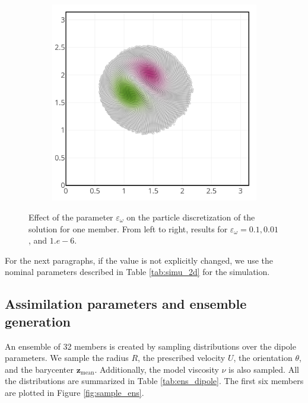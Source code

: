 \begin{figure}[htbp]
\begin{subfigure}{0.3\textwidth}
	\end{subfigure}
	\hfill
	\begin{subfigure}{0.3\textwidth}
		\includegraphics[width=\linewidth]{images/app2d/part_eps_1e-6.png}
	\end{subfigure}
	\caption{Effect of the parameter $\varepsilon_\omega$ on the particle discretization of the solution for one member. From left to right, results for $\varepsilon_\omega = 0.1, 0.01$, and $1.e-6$.}
	\label{fig:eps_effect}
\end{figure}

For the next paragraphs, if the value is not explicitly changed, we use the nominal parameters described in Table \ref{tab:simu_2d} for the simulation.

\subsection{Assimilation parameters and ensemble generation}

An ensemble of 32 members is created by sampling distributions over the dipole parameters. We sample the radius $R$, the prescribed velocity $U$, the orientation $\theta$, and the barycenter $\bm z_{\text{mean}}$. Additionally, the model viscosity $\nu$ is also sampled. All the distributions are summarized in Table \ref{tab:ens_dipole}. The first six members are plotted in Figure \ref{fig:sample_ens}.

